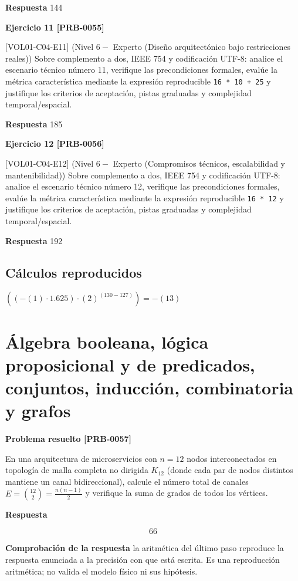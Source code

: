 \documentclass{book}
\begin{document}
\noindent\textbf{Respuesta} 144

\noindent\textbf{Ejercicio 11 [PRB-0055]}

[VOL01-C04-E11] (Nivel \(6 -\) Experto (Diseño arquitectónico bajo restricciones reales)) Sobre complemento a dos, IEEE 754 y codificación UTF-8: analice el escenario técnico número 11, verifique las precondiciones formales, evalúe la métrica característica mediante la expresión reproducible \texttt{16 * 10 + 25} y justifique los criterios de aceptación, pistas graduadas y complejidad temporal/espacial.

\noindent\textbf{Respuesta} 185

\noindent\textbf{Ejercicio 12 [PRB-0056]}

[VOL01-C04-E12] (Nivel \(6 -\) Experto (Compromisos técnicos, escalabilidad y mantenibilidad)) Sobre complemento a dos, IEEE 754 y codificación UTF-8: analice el escenario técnico número 12, verifique las precondiciones formales, evalúe la métrica característica mediante la expresión reproducible \texttt{16 * 12} y justifique los criterios de aceptación, pistas graduadas y complejidad temporal/espacial.

\noindent\textbf{Respuesta} 192

\subsection*{Cálculos reproducidos}

\(\left(\left(-\left(1\right)\cdot 1.625\right)\cdot \left(2\right)^{\left(130-127\right)}\right) = -\left(13\right)\)

\section{Álgebra booleana, lógica proposicional y de predicados, conjuntos, inducción, combinatoria y grafos}

\noindent\textbf{Problema resuelto [PRB-0057]}

En una arquitectura de microservicios con \(n = 12\) nodos interconectados en topología de malla completa no dirigida \(K_{12}\) (donde cada par de nodos distintos mantiene un canal bidireccional), calcule el número total de canales \(E = \binom{12}{2} = \frac{n(n-1)}{2}\) y verifique la suma de grados de todos los vértices.

\noindent\textbf{Respuesta}

\[
66
\]

\noindent\textbf{Comprobación de la respuesta} la aritmética del último paso reproduce la respuesta enunciada a la precisión con que está escrita. Es una reproducción aritmética; no valida el modelo físico ni sus hipótesis.
\end{document}
